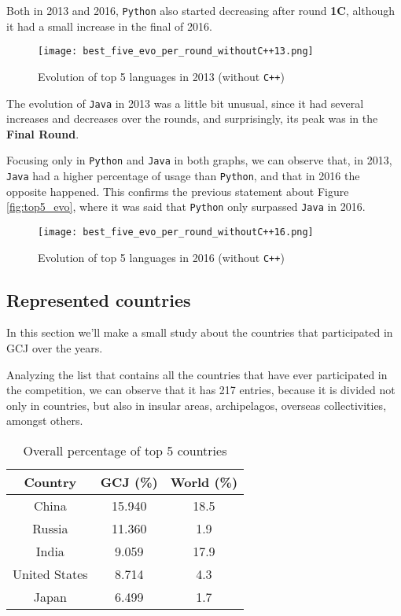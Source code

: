\documentclass{article}
\begin{document}
\begin{multicols*}{2}
Both in 2013 and 2016, \texttt{Python} also started decreasing after round \textbf{1C}, although it had a small increase in the final of 2016.



\begin{figure}[H]
    \centering
    \texttt{[image: best\_five\_evo\_per\_round\_withoutC++13.png]}
    \caption{Evolution of top 5 languages in 2013 (without \texttt{C++})}
    \label{fig:best5_evo_round_13}
\end{figure}

The evolution of \texttt{Java} in 2013 was a little bit unusual, since it had several increases and decreases over the rounds, and surprisingly, its peak was in the \textbf{Final Round}.

Focusing only in \texttt{Python} and \texttt{Java} in both graphs, we can observe that, in 2013, \texttt{Java} had a higher percentage of usage than \texttt{Python}, and that in 2016 the opposite happened. This confirms the previous statement about Figure \ref{fig:top5_evo}, where it was said that \texttt{Python} only surpassed \texttt{Java} in 2016.

\begin{figure}[H]
    \centering
    \texttt{[image: best\_five\_evo\_per\_round\_withoutC++16.png]}
    \caption{Evolution of top 5 languages in 2016 (without \texttt{C++})}
    \label{fig:best5_evo_round_16}
\end{figure}


\subsection{Represented countries}

In this section we'll make a small study about the countries that participated in GCJ over the years.

Analyzing the list that contains all the countries that have ever participated in the competition, we can observe that it has 217 entries, because it is divided not only in countries, but also in insular areas, archipelagos, overseas collectivities, amongst others.


\begin{table}[H]
\centering
\caption{Overall percentage of top 5 countries}
\label{top10_cont}
\begin{tabular}{c|c|c}
\textbf{Country} & \textbf{GCJ (\%)} & \textbf{World (\%)} \\ \hline
China            & 15.940   & 18.5              \\
Russia           & 11.360   & 1.9               \\
India            & 9.059   & 17.9              \\
United States    & 8.714   & 4.3               \\
Japan            & 6.499   & 1.7               \\
\end{tabular}
\end{table}


\end{multicols*}
\end{document}
